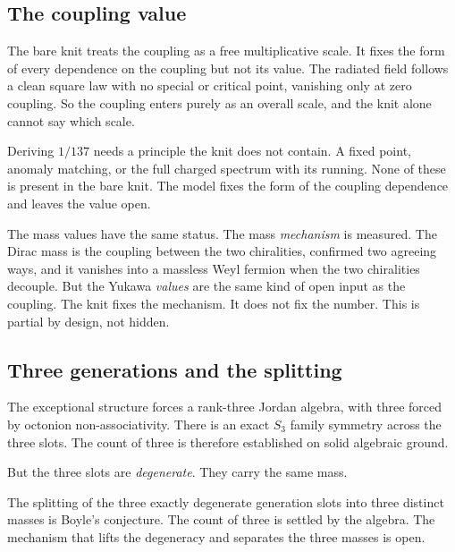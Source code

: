 \subsection{The coupling value}

The bare knit treats the coupling as a free multiplicative scale. It fixes the form of every dependence on the coupling but not its value. The radiated field follows a clean square law with no special or critical point, vanishing only at zero coupling. So the coupling enters purely as an overall scale, and the knit alone cannot say which scale.

\begin{principle}
Deriving $1/137$ needs a principle the knit does not contain. A fixed point, anomaly matching, or the full charged spectrum with its running. None of these is present in the bare knit. The model fixes the form of the coupling dependence and leaves the value open.
\end{principle}

The mass values have the same status. The mass \emph{mechanism} is measured. The Dirac mass is the coupling between the two chiralities, confirmed two agreeing ways, and it vanishes into a massless Weyl fermion when the two chiralities decouple. But the Yukawa \emph{values} are the same kind of open input as the coupling. The knit fixes the mechanism. It does not fix the number. This is partial by design, not hidden.

\subsection{Three generations and the splitting}

The exceptional structure forces a rank-three Jordan algebra, with three forced by octonion non-associativity. There is an exact $S_3$ family symmetry across the three slots. The count of three is therefore established on solid algebraic ground.

But the three slots are \emph{degenerate}. They carry the same mass.

\begin{definition}
The splitting of the three exactly degenerate generation slots into three distinct masses is Boyle's conjecture. The count of three is settled by the algebra. The mechanism that lifts the degeneracy and separates the three masses is open.
\end{definition}

